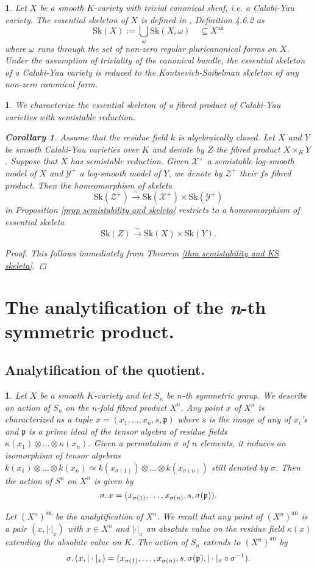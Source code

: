 \documentclass{amsart}%
\numberwithin{equation}{subsection}
\theoremstyle{plain2}
\newtheorem{cor}[equation]{Corollary}
\theoremstyle{definition2}
\theoremstyle{stepstyle}
\theoremstyle{point}
\theoremstyle{subpoint}
\newtheorem{subpoint}[equation]{}%
\newcommand{\spa}[1]{\begin{subpoint}#1\end{subpoint}}           %
\newcommand{\cX}{\ensuremath{\mathscr{X}}}
\newcommand{\fp}{\ensuremath{\mathfrak{p}}}
\newcommand{\cY}{\ensuremath{\mathscr{Y}}}
\newcommand{\cZ}{\ensuremath{\mathscr{Z}}}
\renewcommand{\cZ}{\ensuremath{\mathscr{Z}}}
\renewcommand{\cY}{\ensuremath{\mathscr{Y}}}
\newcommand{\an}{\mathrm{an}}
\newcommand{\Sk}{\mathrm{Sk}}
\begin{document}
\spa{Let $X$ be a smooth $K$-variety with trivial canonical sheaf, i.e. a Calabi-Yau variety. The essential skeleton of $X$ is defined in \cite{MustataNicaise}, Definition 4.6.2 as $$\Sk(X):=\bigcup_{\omega} \Sk(X, \omega) \quad \subseteq X^{\text{an}}$$ where $\omega$ runs through the set of non-zero regular pluricanonical forms on $X$. Under the assumption of triviality of the canonical bundle, the essential skeleton of a Calabi-Yau variety is reduced to the Kontsevich-Soibelman skeleton of any non-zero canonical form.}

\spa{We characterize the essential skeleton of a fibred product of Calabi-Yau varieties with semistable reduction.
\begin{cor}  \label{cor semistability and essential skeleta}
Assume that the residue field $k$ is algebraically closed. Let $X$ and $Y$ be smooth Calabi-Yau varieties over $K$ and denote by $Z$ the fibred product $X\times_K Y$. Suppose that $X$ has semistable reduction. Given $\cX^+$ a semistable log-smooth model of $X$ and $\cY^+$ a log-smooth model of $Y$, we denote by $\cZ^+$ their $fs$ fibred product. Then the homeomorphism of skeleta $$\Sk(\cZ^+) \xrightarrow{\sim} \Sk(\cX^+) \times \Sk(\cY^+)$$ in Proposition \ref{prop semistability and skeleta} restricts to a homeomorphism of essential skeleta $$\Sk(Z) \xrightarrow{\sim} \Sk(X) \times \Sk(Y).$$ 
\end{cor}
\begin{proof}
This follows immediately from Theorem \ref{thm semistability and KS skeleta}.
\end{proof}
}
 
\section{The analytification of the \textit{n}-th symmetric product.} \label{sect an of symm product}
\subsection{Analytification of the quotient.}
\spa{Let $X$ be a smooth $K$-variety and let $S_n$ be $n$-th symmetric group. We describe an action of $S_n$ on the $n$-fold fibred product $X^n$. Any point $x$ of $X^n$ is characterized as a tuple $x=(x_1,\ldots,x_n, s, \fp)$ where $s$ is the image of any of $x_i$'s and $\fp$ is a prime ideal of the tensor algebra of residue fields $\kappa(x_1) \otimes \ldots \otimes \kappa(x_n)$. Given  a permutation $\sigma$ of $n$ elements, it induces an isomorphism of tensor algebras  $k(x_1) \otimes \ldots \otimes k(x_n) \simeq  k(x_{\sigma(1)}) \otimes \ldots \otimes k(x_{\sigma(n)})$ still denoted by $\sigma$. Then the action of $S^n$ on $X^n$ is given by $$\sigma \ldotp x = (x_{\sigma(1)}, \ldots, x_{\sigma(n)}, s, \sigma(\fp)).$$

Let $(X^n)^{\an}$ be the analytification of $X^n$. We recall that any point of $(X^n)^{\an}$ is a pair $(x,|\cdot|_x)$ with $x \in X^n$ and $|\cdot|_x$ an absolute value on the residue field $\kappa(x)$ extending the absolute value on $K$. The action of $S_n$ extends to $(X^n)^\an$ by $$\sigma \ldotp (x,|\cdot|_x) = (x_{\sigma(1)}, \ldots, x_{\sigma(n)}, s, \sigma(\fp), |\cdot|_x \circ \sigma^{-1}).$$}
\end{document}
